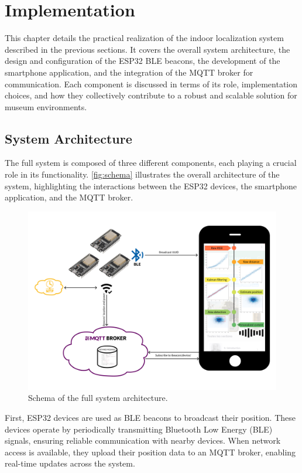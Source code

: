 \chapter{Implementation}
\label{chap:implementation}

This chapter details the practical realization of the indoor localization system described in the previous sections. It covers the overall system architecture, the design and configuration of the ESP32 BLE beacons, the development of the smartphone application, and the integration of the MQTT broker for communication. Each component is discussed in terms of its role, implementation choices, and how they collectively contribute to a robust and scalable solution for museum environments.

\section{System Architecture}
The full system is composed of three different components, each playing a crucial role in its functionality. \autoref{fig:schema} illustrates the overall architecture of the system, highlighting the interactions between the ESP32 devices, the smartphone application, and the MQTT broker.

\begin{figure}
    \centering
    \includegraphics[width=0.9\linewidth]{assets/schema.png}
    \caption{Schema of the full system architecture.}
    \label{fig:schema}
\end{figure}

First, ESP32 devices are used as BLE beacons to broadcast their position. These devices operate by periodically transmitting Bluetooth Low Energy (BLE) signals, ensuring reliable communication with nearby devices. When network access is available, they upload their position data to an MQTT broker, enabling real-time updates across the system.

